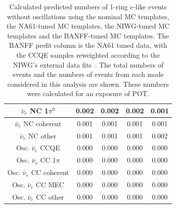 \begin{table}
\begin{tabular} { | c ||c | c | c | c |  | }
$\bar{\nu}_e$ NC 1$\pi^0$                         & 0.002               & 0.002               & 0.002               & 0.001                \\ \hline 
$\bar{\nu}_e$ NC coherent                         & 0.001               & 0.001               & 0.001               & 0.001                \\ \hline 
$\bar{\nu}_e$ NC other                            & 0.001               & 0.001               & 0.001               & 0.002                \\ \hline 
Osc. $\bar{\nu}_e$ CCQE                           & 0.000               & 0.000               & 0.000               & 0.000                \\ \hline 
Osc. $\bar{\nu}_e$ CC 1$\pi$                      & 0.000               & 0.000               & 0.000               & 0.000                \\ \hline 
Osc. $\bar{\nu}_e$ CC coherent                    & 0.000               & 0.000               & 0.000               & 0.000                \\ \hline 
Osc. $\bar{\nu}_e$ CC MEC                         & 0.000               & 0.000               & 0.000               & 0.000                \\ \hline 
Osc. $\bar{\nu}_e$ CC other                       & 0.000               & 0.000               & 0.000               & 0.000                \\ \hline 

\end{tabular}
\caption{
  Calculated predicted numbers of 1-ring $e$-like events without oscillations using the nominal MC templates, the
  NA61-tuned MC templates, the NIWG-tuned MC templates and the BANFF-tuned MC templates.
  The BANFF prefit column is the NA61 tuned data, with the CCQE samples reweighted according to the NIWG's external data fits~\cite{NIWGCCQE}.
  The total numbers of events and the numbers of events from each mode considered in this analysis are shown.
  These numbers were calculated for an exposure of \TotalPot POT.
}
\label{tab:nsk_nominal_no_osc}
\end{table}

